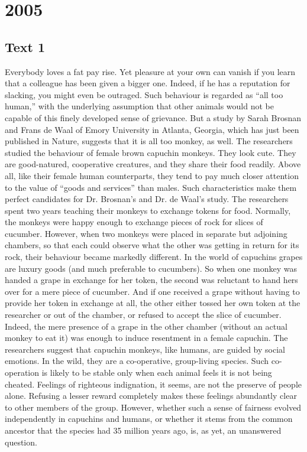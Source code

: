 
\section{2005}
\subsection{Text 1}
Everybody loves a fat pay rise. Yet pleasure at your own can vanish if you learn that a colleague has been given a bigger one. Indeed, if he has a reputation for slacking, you might even be outraged. Such behaviour is regarded as “all too human,” with the underlying assumption that other animals would not be capable of this finely developed sense of grievance. But a study by Sarah Brosnan and Frans de Waal of Emory University in Atlanta, Georgia, which has just been published in Nature, suggests that it is all too monkey, as well.
The researchers studied the behaviour of female brown capuchin monkeys. They look cute. They are good-natured, cooperative creatures, and they share their food readily. Above all, like their female human counterparts, they tend to pay much closer attention to the value of “goods and services” than males.
Such characteristics make them perfect candidates for Dr. Brosnan’s and Dr. de Waal’s study. The researchers spent two years teaching their monkeys to exchange tokens for food. Normally, the monkeys were happy enough to exchange pieces of rock for slices of cucumber. However, when two monkeys were placed in separate but adjoining chambers, so that each could observe what the other was getting in return for its rock, their behaviour became markedly different.
In the world of capuchins grapes are luxury goods (and much preferable to cucumbers). So when one monkey was handed a grape in exchange for her token, the second was reluctant to hand hers over for a mere piece of cucumber. And if one received a grape without having to provide her token in exchange at all, the other either tossed her own token at the researcher or out of the chamber, or refused to accept the slice of cucumber. Indeed, the mere presence of a grape in the other chamber (without an actual monkey to eat it) was enough to induce resentment in a female capuchin.
The researchers suggest that capuchin monkeys, like humans, are guided by social emotions. In the wild, they are a co-operative, group-living species. Such co-operation is likely to be stable only when each animal feels it is not being cheated. Feelings of righteous indignation, it seems, are not the preserve of people alone. Refusing a lesser reward completely makes these feelings abundantly clear to other members of the group. However, whether such a sense of fairness evolved independently in capuchins and humans, or whether it stems from the common ancestor that the species had 35 million years ago, is, as yet, an unanswered question.
